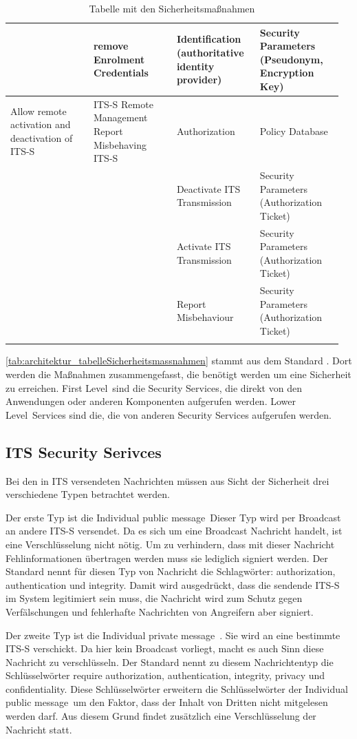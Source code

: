 \begin{longtable}{| p{0.24\linewidth} | p{0.24\linewidth} | p{0.24\linewidth} |p{0.24\linewidth}|}
\cline{2-4}
& remove Enrolment Credentials & Identification (authoritative identity provider) & Security Parameters (Pseudonym, Encryption Key)\\
\hline
Allow remote activation and deactivation of ITS-S & ITS-S Remote Management Report Misbehaving ITS-S & Authorization & Policy Database \\
\cline{3-4}
 & & Deactivate ITS Transmission & Security Parameters (Authorization Ticket) \\
 \cline{3-4}
& &  Activate ITS Transmission & Security Parameters (Authorization Ticket) \\
\cline{3-4}
& & Report Misbehaviour & Security Parameters (Authorization Ticket) \\
\hline 
\caption{Tabelle mit den Sicherheitsmaßnahmen \cite{ts102731}}
\label{tab:architektur_tabelleSicherheitsmassnahmen}
 
 \end{longtable}
\autoref{tab:architektur_tabelleSicherheitsmassnahmen} stammt aus dem Standard \cite{ts102731}. Dort werden die Maßnahmen zusammengefasst, die benötigt werden um eine Sicherheit zu erreichen. \glqq First Level\grqq~sind die Security Services, die direkt von den Anwendungen oder anderen Komponenten aufgerufen werden.  \glqq Lower Level\grqq~Services sind die, die von anderen Security Services aufgerufen werden.


\subsection{ITS Security Serivces}
Bei den in \ac{ITS} versendeten Nachrichten müssen aus Sicht der Sicherheit drei verschiedene Typen betrachtet werden. 

Der erste Typ ist die \glqq Individual public message\grqq~Dieser Typ wird per Broadcast an andere \ac{ITS-S} versendet. Da es sich um eine Broadcast Nachricht handelt, ist eine Verschlüsselung nicht nötig. Um zu verhindern, dass mit dieser Nachricht Fehlinformationen übertragen werden muss sie lediglich signiert werden. Der Standard \cite{ts102731} nennt für diesen Typ von Nachricht die Schlagwörter: authorization, authentication und integrity. Damit wird ausgedrückt, dass die sendende \ac{ITS-S} im System legitimiert sein muss, die Nachricht wird zum Schutz gegen Verfälschungen und fehlerhafte Nachrichten von Angreifern aber signiert.

Der zweite Typ ist die \glqq    Individual private message\grqq~. Sie wird an eine bestimmte \ac{ITS-S} verschickt. Da hier kein Broadcast vorliegt, macht es auch Sinn diese Nachricht zu verschlüsseln. Der Standard nennt zu diesem Nachrichtentyp die Schlüsselwörter require authorization, authentication, integrity, privacy und confidentiality. Diese Schlüs\-sel\-wört\-er erweitern die Schlüs\-sel\-wört\-er der \glqq Individual public message\grqq~um den Faktor, dass der Inhalt von Dritten nicht mitgelesen werden darf. Aus diesem Grund findet zusätzlich eine Verschlüsselung der Nachricht statt.

